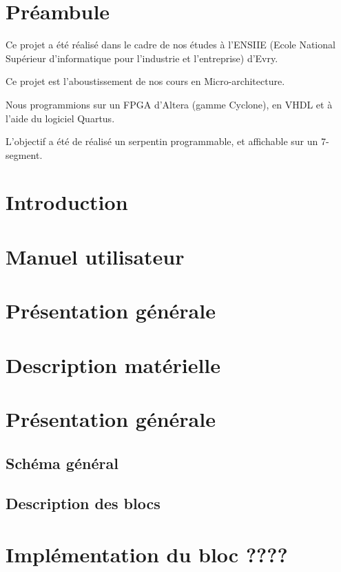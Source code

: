 \documentclass[10pt]{article}
\begin{document}
    \tableofcontents
    \section{Préambule}
    Ce projet a été réalisé dans le cadre de nos études à l'ENSIIE (Ecole National Supérieur d'informatique pour l'industrie et l'entreprise) d'Evry.
    
    Ce projet est l'aboustissement de nos cours en Micro-architecture.
    
    Nous programmions sur un FPGA d'Altera (gamme Cyclone), en VHDL et à l'aide du logiciel Quartus.
    
    L'objectif a été de réalisé un serpentin programmable, et affichable sur un 7-segment.

    \newpage
    \section{Introduction}

    \newpage
    \section{Manuel utilisateur}
    
    \newpage
    \section{Présentation générale}
   
    \newpage
    \section{Description matérielle}
    
    \newpage
    \section{Présentation générale}
        \subsection{Schéma général}
        \subsection{Description des blocs}
        
    \newpage
    \section{Implémentation du bloc ????}
    
    
\end{document}

